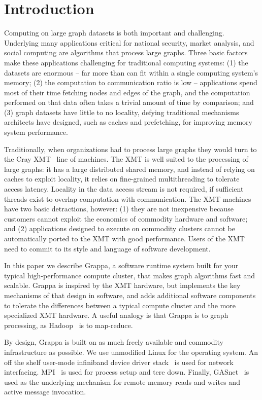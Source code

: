 \section{Introduction} \label{sec:intro}

Computing on large graph datasets is both important and challenging.  Underlying many applications critical for national security, market analysis, and social computing are algorithms that process large graphs.  Three basic factors make these applications challenging for traditional computing systems: (1) the datasets are enormous -- far more than can fit within a single computing system's memory; (2) the computation to communication ratio is low -- applications spend most of their time fetching nodes and edges of the graph, and the computation performed on that data often takes a trivial amount of time by comparison; and (3) graph datasets have little to no locality, defying traditional mechanisms architects have designed, such as caches and prefetching, for improving memory system performance.

Traditionally, when organizations had to process large graphs they would turn to the Cray XMT~\cite{xmt} line of machines.  The XMT is well suited to the processing of large graphs: it has a large distributed shared memory, and instead of relying on caches to exploit locality, it relies on fine-grained multithreading to tolerate access latency.  Locality in the data access stream is not required, if sufficient threads exist to overlap computation with communication.  The XMT machines have two basic detractions, however: (1) they are not inexpensive because customers cannot exploit the economics of commodity hardware and software; and (2) applications designed to execute on commodity clusters cannot be automatically ported to the XMT with good performance.  Users of the XMT need to commit to its style and language of software development.

In this paper we describe Grappa, a software runtime system built for your typical high-performance compute cluster, that makes graph algorithms fast and scalable.  Grappa is inspired by the XMT hardware, but implements the key mechanisms of that design in software, and adds additional software components to tolerate the differences between a typical compute cluster and the more specialized XMT hardware.  A useful analogy is that Grappa is to graph processing, as Hadoop~\cite{hadoop} is to map-reduce.

By design, Grappa is built on as much freely available and commodity infrastructure as possible.  We use unmodified Linux for the operating system.  An off the shelf user-mode infiniband device driver stack~\cite{Melonox?} is used for network interfacing.  MPI~\cite{mpi} is used for process setup and tere down.  Finally, GASnet~\cite{gasnet} is used as the underlying mechanism for remote memory reads and writes and active message invocation.

